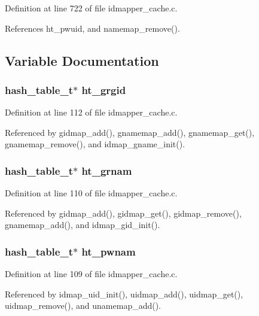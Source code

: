 Definition at line 722 of file idmapper\_\-cache.c.

References ht\_\-pwuid, and namemap\_\-remove().

\subsection{Variable Documentation}
\subsubsection{\setlength{\rightskip}{0pt plus 5cm}hash\_\-table\_\-t$\ast$ {\bf ht\_\-grgid}}\label{idmapper__cache_8c_a3}




Definition at line 112 of file idmapper\_\-cache.c.

Referenced by gidmap\_\-add(), gnamemap\_\-add(), gnamemap\_\-get(), gnamemap\_\-remove(), and idmap\_\-gname\_\-init().
\subsubsection{\setlength{\rightskip}{0pt plus 5cm}hash\_\-table\_\-t$\ast$ {\bf ht\_\-grnam}}\label{idmapper__cache_8c_a1}




Definition at line 110 of file idmapper\_\-cache.c.

Referenced by gidmap\_\-add(), gidmap\_\-get(), gidmap\_\-remove(), gnamemap\_\-add(), and idmap\_\-gid\_\-init().
\subsubsection{\setlength{\rightskip}{0pt plus 5cm}hash\_\-table\_\-t$\ast$ {\bf ht\_\-pwnam}}\label{idmapper__cache_8c_a0}




Definition at line 109 of file idmapper\_\-cache.c.

Referenced by idmap\_\-uid\_\-init(), uidmap\_\-add(), uidmap\_\-get(), uidmap\_\-remove(), and unamemap\_\-add().
